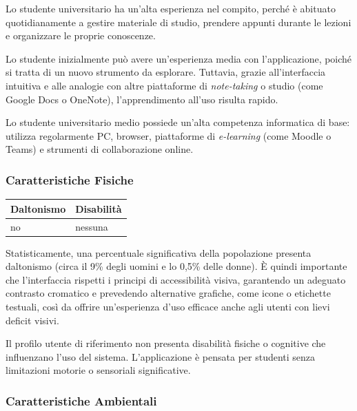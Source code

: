 Lo studente universitario ha un'alta esperienza nel compito, perché è abituato quotidianamente a gestire materiale di studio, prendere appunti durante le lezioni e organizzare le proprie conoscenze.

Lo studente inizialmente può avere un'esperienza media con l'applicazione, poiché si tratta di un nuovo strumento da esplorare. Tuttavia, grazie all'interfaccia intuitiva e alle analogie con altre piattaforme di \textit{note-taking} o studio (come Google Docs o OneNote), l'apprendimento all'uso risulta rapido.

Lo studente universitario medio possiede un'alta competenza informatica di base: utilizza regolarmente PC, browser, piattaforme di \textit{e-learning} (come Moodle o Teams) e strumenti di collaborazione online.

\subsubsection{Caratteristiche Fisiche}

\begin{table}[h]
	\centering
	\renewcommand{\arraystretch}{1.5}
	\begin{tabular}{|>{\raggedright\arraybackslash}p{7.5cm}|>{\raggedright\arraybackslash}p{7.5cm}|}
		\hline
		\rowcolor{green!30}
		\textbf{Daltonismo} & \textbf{Disabilità} \\
		\hline
		no                  & nessuna             \\
		\hline
	\end{tabular}
\end{table}

Statisticamente, una percentuale significativa della popolazione presenta daltonismo (circa il 9\% degli uomini e lo 0,5\% delle donne). È quindi importante che l'interfaccia rispetti i principi di accessibilità visiva, garantendo un adeguato contrasto cromatico e prevedendo alternative grafiche, come icone o etichette testuali, così da offrire un'esperienza d'uso efficace anche agli utenti con lievi deficit visivi.

Il profilo utente di riferimento non presenta disabilità fisiche o cognitive che influenzano l'uso del sistema. L'applicazione è pensata per studenti senza limitazioni motorie o sensoriali significative.

\subsubsection{Caratteristiche Ambientali}


